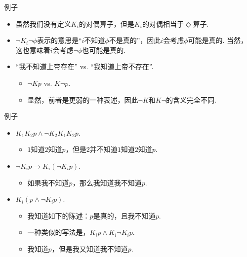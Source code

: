 \begin{frame}{例子}
\begin{itemize}
    \item 虽然我们没有定义$K_i$的对偶算子，但是$K_i$的对偶相当于$\Diamond$算子.
    \item $\neg K_i\neg\phi$表示的意思是“$i$不知道$\phi$不是真的”，因此$i$会考虑$\phi$可能是真的. 当然，这也意味着$i$会考虑$\neg\phi$也可能是真的.
    \item “我不知道上帝存在” vs. “我知道上帝不存在”.
    \begin{itemize}
        \item $\neg Kp$ vs. $K\neg p$.
        \item 显然，前者是更弱的一种表述，因此$\neg K$和$K\neg$的含义完全不同.
    \end{itemize}
\end{itemize}
\end{frame}

\begin{frame}{例子}
\begin{itemize}
    \item $K_1K_2p\wedge \neg K_2K_1K_2 p$.
    \begin{itemize}
        \item $1$知道$2$知道$p$，但是$2$并不知道$1$知道$2$知道$p$.
    \end{itemize}
    \item $\neg K_i p\to K_i(\neg K_i p)$.
    \begin{itemize}
        \item 如果我不知道$p$，那么我知道我不知道$p$.
    \end{itemize}
    \item $K_i(p\wedge\neg K_i p)$.
    \begin{itemize}
        \item 我知道如下的陈述：$p$是真的，且我不知道$p$.
        \item 一种类似的写法是，$K_ip\wedge K_i\neg K_ip$.
        \item 我知道$p$，但是我又知道我不知道$p$.
    \end{itemize}
\end{itemize}
\end{frame}

